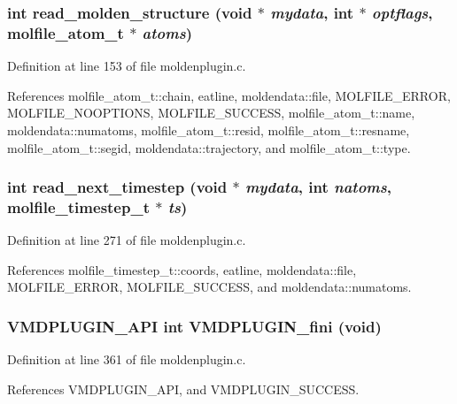 \subsubsection{\setlength{\rightskip}{0pt plus 5cm}int read\_\-molden\_\-structure (void $\ast$ {\em mydata}, int $\ast$ {\em optflags}, {\bf molfile\_\-atom\_\-t} $\ast$ {\em atoms})\hspace{0.3cm}{\tt  [static]}}\label{moldenplugin_8c_a3}




Definition at line 153 of file moldenplugin.c.

References molfile\_\-atom\_\-t::chain, eatline, moldendata::file, MOLFILE\_\-ERROR, MOLFILE\_\-NOOPTIONS, MOLFILE\_\-SUCCESS, molfile\_\-atom\_\-t::name, moldendata::numatoms, molfile\_\-atom\_\-t::resid, molfile\_\-atom\_\-t::resname, molfile\_\-atom\_\-t::segid, moldendata::trajectory, and molfile\_\-atom\_\-t::type.
\subsubsection{\setlength{\rightskip}{0pt plus 5cm}int read\_\-next\_\-timestep (void $\ast$ {\em mydata}, int {\em natoms}, {\bf molfile\_\-timestep\_\-t} $\ast$ {\em ts})\hspace{0.3cm}{\tt  [static]}}\label{moldenplugin_8c_a4}




Definition at line 271 of file moldenplugin.c.

References molfile\_\-timestep\_\-t::coords, eatline, moldendata::file, MOLFILE\_\-ERROR, MOLFILE\_\-SUCCESS, and moldendata::numatoms.
\subsubsection{\setlength{\rightskip}{0pt plus 5cm}VMDPLUGIN\_\-API int VMDPLUGIN\_\-fini (void)}\label{moldenplugin_8c_a8}




Definition at line 361 of file moldenplugin.c.

References VMDPLUGIN\_\-API, and VMDPLUGIN\_\-SUCCESS.
